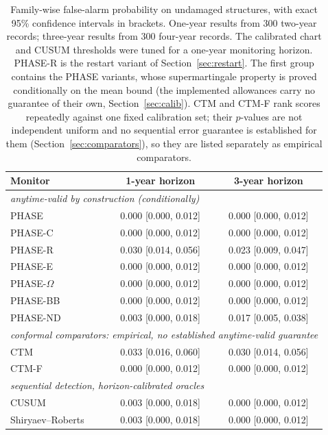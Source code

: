 \documentclass[12pt,a4paper]{article}
\newcommand{\rev}[1]{#1}
\newenvironment{revblock}{}{}
\newcommand{\rev}[1]{{\color{revcol}#1}}
\newenvironment{revblock}{\begingroup\color{revcol}}{\endgroup}
\newcommand{\rtwo}[1]{#1}
\newcommand{\rtwo}[1]{{\color{revcolb}#1}}
\begin{document}
\begin{table}[t]
\centering
\small
\begin{revblock}
\caption{Family-wise false-alarm probability on undamaged structures, with exact 95\% confidence intervals in brackets. One-year results from 300 two-year records; three-year results from 300 four-year records. The calibrated chart and CUSUM thresholds were tuned for a one-year monitoring horizon. PHASE-R is the restart variant of Section~\ref{sec:restart}. \color{revcolb}\rev{The first group contains the PHASE variants, whose supermartingale property is proved conditionally on the mean bound (the implemented allowances carry no guarantee of their own, Section~\ref{sec:calib}).\color{revcol} \color{revcolb}CTM and CTM-F rank scores repeatedly against one fixed calibration set; their $p$-values are not independent uniform and no sequential error guarantee is established for them (Section~\ref{sec:comparators}), so they are listed separately as empirical comparators.}\color{revcol}}
\label{tab:fwer}
\begin{tabular}{lcc}
\toprule
Monitor & 1-year horizon & 3-year horizon \\
\midrule
\multicolumn{3}{l}{\textit{anytime-valid by construction (conditionally)}}\\
PHASE & 0.000 [0.000, 0.012] & 0.000 [0.000, 0.012] \\
PHASE-C & 0.000 [0.000, 0.012] & 0.000 [0.000, 0.012] \\
PHASE-R & 0.030 [0.014, 0.056] & 0.023 [0.009, 0.047] \\
PHASE-E & 0.000 [0.000, 0.012] & 0.000 [0.000, 0.012] \\
PHASE-$\Omega$ & 0.000 [0.000, 0.012] & 0.000 [0.000, 0.012] \\
PHASE-BB & 0.000 [0.000, 0.012] & 0.000 [0.000, 0.012] \\
PHASE-ND & 0.003 [0.000, 0.018] & 0.017 [0.005, 0.038] \\
\midrule
\multicolumn{3}{l}{\textit{\rtwo{conformal comparators: empirical, no established anytime-valid guarantee}}}\\
CTM & 0.033 [0.016, 0.060] & 0.030 [0.014, 0.056] \\
CTM-F & 0.000 [0.000, 0.012] & 0.000 [0.000, 0.012] \\
\midrule
\multicolumn{3}{l}{\textit{sequential detection, horizon-calibrated oracles}}\\
CUSUM & 0.003 [0.000, 0.018] & 0.000 [0.000, 0.012] \\
Shiryaev--Roberts & 0.003 [0.000, 0.018] & 0.000 [0.000, 0.012] \\

\end{tabular}
\end{revblock}
\end{table}
\end{document}
